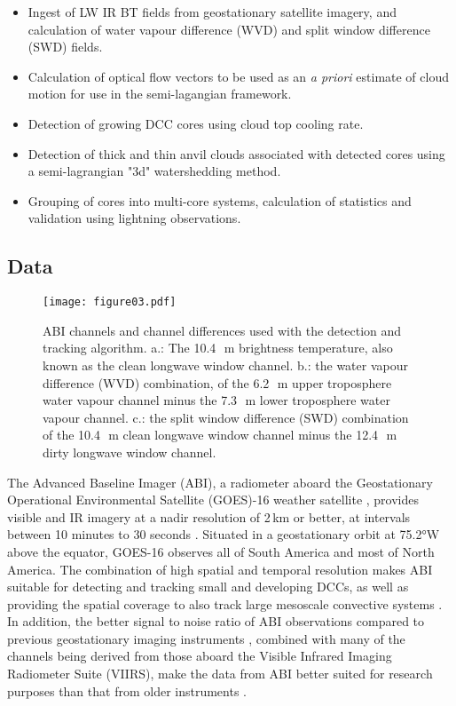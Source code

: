 \begin{itemize}
    \item Ingest of LW IR BT fields from geostationary satellite imagery, and calculation of water vapour difference (WVD) and split window difference (SWD) fields.
    \item Calculation of optical flow vectors to be used as an \textit{a priori} estimate of cloud motion for use in the semi-lagangian framework.
    \item Detection of growing DCC cores using cloud top cooling rate.
    \item Detection of thick and thin anvil clouds associated with detected cores using a semi-lagrangian "3d" watershedding method. 
    \item Grouping of cores into multi-core systems, calculation of statistics and validation using lightning observations.
\end{itemize}

\subsection{Data}

\begin{figure}[t]
    \centering
    \texttt{[image: figure03.pdf]}
    \caption{ABI channels and channel differences used with the detection and tracking algorithm. a.: The 10.4\,\unit{\mu m} brightness temperature, also known as the clean longwave window channel. b.: the water vapour difference (WVD) combination, of the 6.2\,\unit{\mu m} upper troposphere water vapour channel minus the 7.3\,\unit{\mu m} lower troposphere water vapour channel. c.: the split window difference (SWD) combination of the 10.4\,\unit{\mu m} clean longwave window channel minus the 12.4\,\unit{\mu m} dirty longwave window channel.}
    \label{fig:abi_channels}
\end{figure}

The Advanced Baseline Imager (ABI), a radiometer aboard the Geostationary Operational Environmental Satellite (GOES)-16 weather satellite \citep{schmit_closer_2016}, provides visible and IR imagery at a nadir resolution of 2\,\unit{km} or better, at intervals between 10 minutes to 30 seconds \citep{schmit_chapter_2020}.
Situated in a geostationary orbit at 75.2°W above the equator, GOES-16 observes all of South America and most of North America.
The combination of high spatial and temporal resolution makes ABI suitable for detecting and tracking small and developing DCCs, as well as providing the spatial coverage to also track large mesoscale convective systems \citep{heikenfeld_tobac_2019}.
In addition, the better signal to noise ratio of ABI observations compared to previous geostationary imaging instruments \citep{iacovazzi_goes-16_2020}, combined with many of the channels being derived from those aboard the Visible Infrared Imaging Radiometer Suite (VIIRS), make the data from ABI better suited for research purposes than that from older instruments \citep{heidinger_chapter_2020}.

